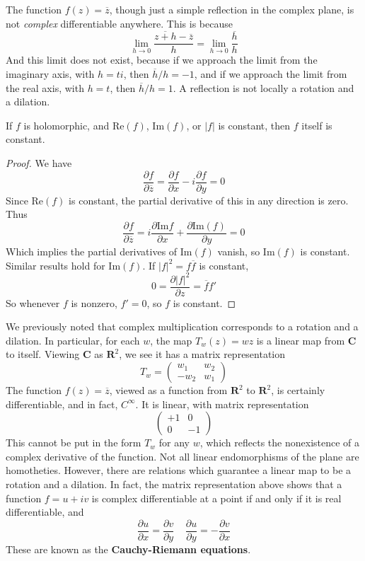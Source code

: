 \begin{example}
    The function $f(z) = \overline{z}$, though just a simple reflection in the complex plane, is not {\it complex} differentiable anywhere. This is because
    \[ \lim_{h \to 0} \frac{\overline{z + h} - \overline{z}}{h} = \lim_{h \to 0} \frac{\overline{h}}{h} \]
    And this limit does not exist, because if we approach the limit from the imaginary axis, with $h = ti$, then $\overline{h}/h = -1$, and if we approach the limit from the real axis, with $h = t$, then $\overline{h}/h = 1$. A reflection is not locally a rotation and a dilation.
\end{example}

\begin{theorem}
    If $f$ is holomorphic, and $\text{Re}(f)$, $\text{Im}(f)$, or $|f|$ is constant, then $f$ itself is constant.
\end{theorem}
\begin{proof}
    We have
    \[ \frac{\partial f}{\partial \overline{z}} = \frac{\partial f}{\partial x} - i \frac{\partial f}{\partial y} = 0 \]
    Since $\text{Re}(f)$ is constant, the partial derivative of this in any direction is zero. Thus
    \[ \frac{\partial f}{\partial \overline{z}} = i \frac{\partial \text{Im} f}{\partial x} + \frac{\partial \text{Im}(f)}{\partial y} = 0 \]
    Which implies the partial derivatives of $\text{Im}(f)$ vanish, so $\text{Im}(f)$ is constant. Similar results hold for $\text{Im}(f)$. If $|f|^2 = f \overline{f}$ is constant,
    \[ 0 = \frac{\partial |f|^2}{\partial z} = \overline{f} f' \]
    So whenever $f$ is nonzero, $f' = 0$, so $f$ is constant.
\end{proof}

We previously noted that complex multiplication corresponds to a rotation and a dilation. In particular, for each $w$, the map $T_w(z) = wz$ is a linear map from $\mathbf{C}$ to itself. Viewing $\mathbf{C}$ as $\mathbf{R}^2$, we see it has a matrix representation
%
\[ T_w = \begin{pmatrix} w_1 & w_2 \\ -w_2 & w_1 \end{pmatrix} \]
%
The function $f(z) = \overline{z}$, viewed as a function from $\mathbf{R}^2$ to $\mathbf{R}^2$, is certainly differentiable, and in fact, $C^\infty$. It is linear, with matrix representation
%
\[ \begin{pmatrix} +1 & 0 \\ 0 & -1 \end{pmatrix} \]
%
This cannot be put in the form $T_w$ for any $w$, which reflects the nonexistence of a complex derivative of the function. Not all linear endomorphisms of the plane are homotheties. However, there are relations which guarantee a linear map to be a rotation and a dilation. In fact, the matrix representation above shows that a function $f = u + iv$ is complex differentiable at a point if and only if it is real differentiable, and
%
\[ \frac{\partial u}{\partial x} = \frac{\partial v}{\partial y}\ \ \ \ \ \frac{\partial u}{\partial y} = -\frac{\partial v}{\partial x} \]
%
These are known as the {\bf Cauchy-Riemann equations}.

